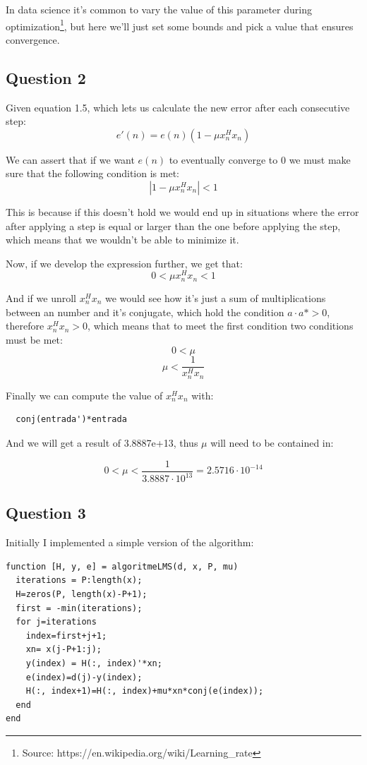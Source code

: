 \documentclass[conference,9pt]{IEEEtran}
\begin{document}
In data science it's common to vary the value of this parameter during optimization\footnote{Source: https://en.wikipedia.org/wiki/Learning\_rate}, but here we'll just set some bounds and pick a value that ensures convergence.

\subsection{Question 2}

Given equation 1.5, which lets us calculate the new error after each consecutive step:
$$e'(n)=e(n)(1-\mu x_n^H x_n)$$

We can assert that if we want $e(n)$ to eventually converge to 0 we must make sure that the following condition is met:
$$|1-\mu x_n^H x_n|<1$$

This is because if this doesn't hold we would end up in situations where the error after applying a step is equal or larger than the one before applying the step, which means that we wouldn't be able to minimize it.

Now, if we develop the expression further, we get that:
$$0 < \mu x_n^H x_n < 1$$

And if we unroll $x_n^H x_n$ we would see how it's just a sum of multiplications between an number and it's conjugate, which hold the condition $a\cdot a*>0$, therefore $x_n^H x_n > 0$, which means that to meet the first condition two conditions must be met:
$$0 < \mu$$
$$\mu < \dfrac{1}{x_n^H x_n}$$

Finally we can compute the value of $x_n^H x_n$ with:
\begin{verbatim}
  conj(entrada')*entrada
\end{verbatim}

And we will get a result of 3.8887e+13, thus $\mu$ will need to be contained in:

$$0<\mu <\dfrac{1}{3.8887\cdot 10^{13}}=2.5716\cdot 10^{-14}$$

\subsection{Question 3}
Initially I implemented a simple version of the algorithm:
\begin{verbatim}
function [H, y, e] = algoritmeLMS(d, x, P, mu)
  iterations = P:length(x);
  H=zeros(P, length(x)-P+1);
  first = -min(iterations);
  for j=iterations
    index=first+j+1;
    xn= x(j-P+1:j);
    y(index) = H(:, index)'*xn;
    e(index)=d(j)-y(index);
    H(:, index+1)=H(:, index)+mu*xn*conj(e(index));
  end
end
\end{verbatim}
\end{document}
